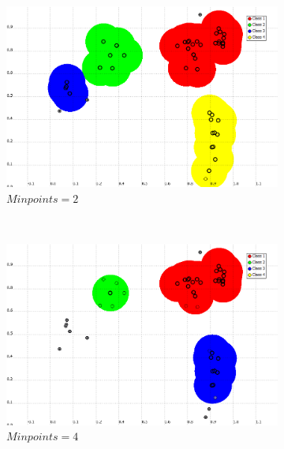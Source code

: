 \documentclass[a4paper,10pt]{article}
\begin{document}
\begin{figure}[H]
\centering
    \begin{subfigure}[t]{0.2\textwidth}
      \centering
      \includegraphics[width=\textwidth]{pictures/DBSCAN-epsilon01-Minpoint-2}
      \caption{$Minpoints = 2$}
      \label{fig:DBSCAN-epsilon01-Minpoint-2}
     \end{subfigure}
      ~
    \begin{subfigure}[t]{0.2\textwidth}
      \centering
      \includegraphics[width=\textwidth]{pictures/DBSCAN-epsilon01-Minpoint-4}
      \caption{$Minpoints = 4$}
      \label{fig:DBSCAN-epsilon01-Minpoint-4}
     \end{subfigure}
      ~
    \begin{subfigure}[t]{0.2\textwidth}
      \centering

\end{subfigure}
\end{figure}
\end{document}

